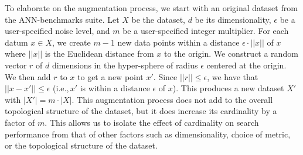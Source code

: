 To elaborate on the augmentation process, we start with an original dataset from the ANN-benchmarks suite.
Let $X$ be the dataset, $d$ be its dimensionality, $\epsilon$ be a user-specified noise level, and $m$ be a user-specified integer multiplier.
For each datum $x \in X$, we create $m - 1$ new data points within a distance $\epsilon \cdot ||x||$ of $x$ where $||x||$ is the Euclidean distance from $x$ to the origin.
We construct a random vector $r$ of $d$ dimensions in the hyper-sphere of radius $\epsilon$ centered at the origin.
We then add $r$ to $x$ to get a new point $x'$.
Since $||r|| \leq \epsilon$, we have that $||x - x'|| \leq \epsilon$ (i.e.,\,$x'$ is within a distance $\epsilon$ of $x$).
This produces a new dataset $X'$ with $|X'| = m \cdot |X|$.
This augmentation process does not add to the overall topological structure of the dataset, but it does increase its cardinality by a factor of $m$.
This allows us to isolate the effect of cardinality on search performance from that of other factors such as dimensionality, choice of metric, or the topological structure of the dataset.
